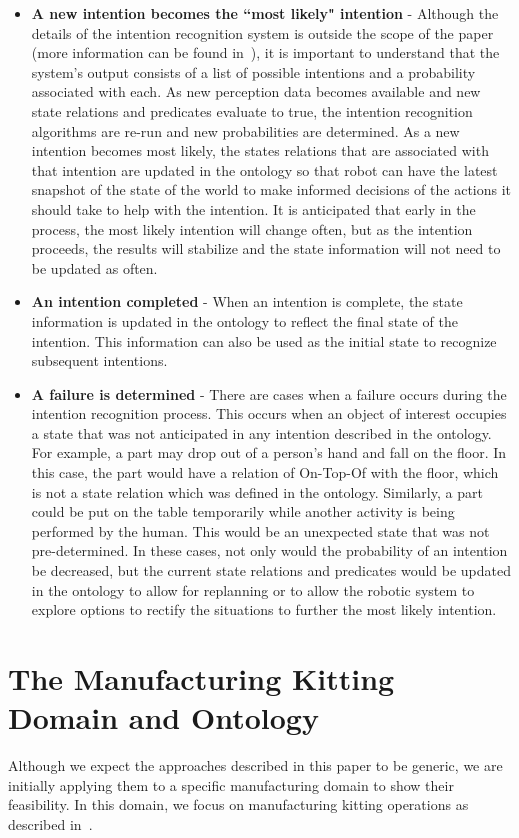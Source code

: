 \documentclass[preprint,12pt]{elsarticle}
\begin{document}
\begin{itemize}
\item \textbf{A new intention becomes the ``most likely" intention} - Although the details of the intention recognition system is outside the scope of the paper (more information can be found in~\cite{SCHLENOFF.ECDRM.2012}), it is important to understand that the system's output consists of a list of possible intentions and a probability associated with each. As new perception data becomes available and new state relations and predicates evaluate to true, the intention recognition algorithms are re-run and new probabilities are determined. As a new intention becomes most likely, the states relations that are associated with that intention are updated in the ontology so that robot can have the latest snapshot of the state of the world to make informed decisions of the actions it should take to help with the intention. It is anticipated that early in the process, the most likely intention will change often, but as the intention proceeds, the results will stabilize and the state information will not need to be updated as often.
\item \textbf{An intention completed} - When an intention is complete, the state information is updated in the ontology to reflect the final state of the intention. This information can also be used as the initial state to recognize subsequent intentions.
\item \textbf{A failure is determined} - There are cases when a failure occurs during the intention recognition process. This occurs when an object of interest occupies a state that was not anticipated in any intention described in the ontology. For example, a part may drop out of a person's hand and fall on the floor. In this case, the part would have a relation of On-Top-Of with the floor, which is not a state relation which was defined in the ontology. Similarly, a part could be put on the table temporarily while another activity is being performed by the human. This would be an unexpected state that was not pre-determined. In these cases, not only would the probability of an intention be decreased, but the current state relations and predicates would be updated in the ontology to allow for replanning or to allow the robotic system to explore options to rectify the situations to further the most likely intention.
\end{itemize}


\section{The Manufacturing Kitting Domain and Ontology}\label{S:section3}
Although we expect the approaches described in this paper to be generic, we are initially applying them to a specific manufacturing domain to show their feasibility. In this domain, we focus on manufacturing kitting operations as described in~\cite{Balakirsky.IROS.2012}.
\end{document}
